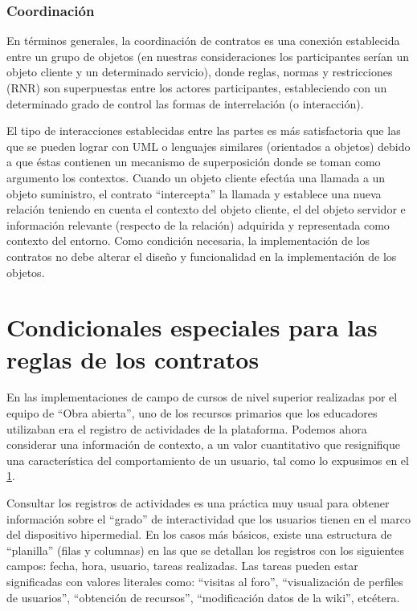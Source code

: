 {\subsubsection {Coordinación}

En términos generales, la coordinación de contratos es una conexión establecida
entre un grupo de objetos (en nuestras consideraciones los participantes
serían un objeto cliente y un determinado servicio), donde reglas, normas y
restricciones (RNR) son superpuestas entre los actores participantes, estableciendo
con un determinado grado de control las formas de interrelación (o
interacción).

El tipo de interacciones establecidas entre las partes es más satisfactoria
que las que se pueden lograr con UML o lenguajes similares (orientados a objetos)
debido a que éstas contienen un mecanismo de superposición donde se
toman como argumento los contextos. Cuando un objeto cliente efectúa una
llamada a un objeto suministro, el contrato “intercepta” la llamada y establece
una nueva relación teniendo en cuenta el contexto del objeto cliente, el
del objeto servidor e información relevante (respecto de la relación) adquirida
y representada como contexto del entorno. Como condición necesaria, la
implementación de los contratos no debe alterar el diseño y funcionalidad en
la implementación de los objetos.


\section{Condicionales especiales para las reglas de los contratos}

En las implementaciones de campo de cursos de nivel superior realizadas por
el equipo de “Obra abierta”, uno de los recursos primarios que los educadores
utilizaban era el registro de actividades de la plataforma. Podemos ahora considerar
una información de contexto, a un valor cuantitativo que resignifique
una característica del comportamiento de un usuario, tal como lo expusimos
en el \ref{}.

Consultar los registros de actividades es una práctica muy usual para obtener
información sobre el “grado” de interactividad que los usuarios tienen en el
marco del dispositivo hipermedial. En los casos más básicos, existe una estructura
de “planilla” (filas y columnas) en las que se detallan los registros con los
siguientes campos: fecha, hora, usuario, tareas realizadas. Las tareas pueden estar
significadas con valores literales como: “visitas al foro”, “visualización de perfiles
de usuarios”, “obtención de recursos”, “modificación datos de la wiki”, etcétera.

}
